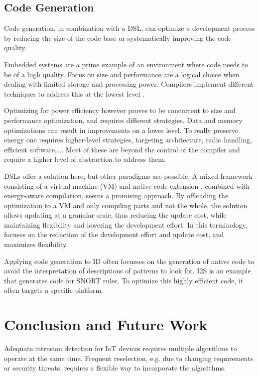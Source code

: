 \documentclass[conference]{IEEEtran}
\begin{document}
\subsection{Code Generation}

Code generation, in combination with a DSL, can optimize a development process
by reducing the size of the code base or systematically improving the code
quality.

Embedded systems are a prime example of an environment where code needs to be
of a high quality. Focus on size and performance are a logical choice when
dealing with limited storage and processing power. Compilers implement
different techniques to address this at the lowest level
\cite{marwedel2002code}.

Optimizing for power efficiency however proves to be concurrent to size and
performance optimization, and requires different strategies. Data and memory
optimizations \cite{panda2001data} can result in improvements on a lower level.
To really preserve energy one requires higher-level strategies, targeting
architecture, radio handling, efficient software,\dots \cite{naik2001software}.
Most of these are beyond the control of the compiler and require a higher level
of abstraction to address them.

DSLs offer a solution here, but other paradigms are possible. A mixed framework
consisting of a virtual machine (VM) and native code extension
\cite{sadilek2007energy}, combined with energy-aware compilation, seems a
promising approach. By offloading the optimization to a VM and only compiling
parts and not the whole, the solution allows updating at a granular scale, thus
reducing the update cost, while maintaining flexibility and lowering the
development effort. In this terminology, \NAME focuses on the reduction of the
development effort and update cost, and maximizes flexibility.

Applying code generation to ID often focusses on the generation of native code
to avoid the interpretation of descriptions of patterns to look for. I2S
\cite{charitakis2003code} is an example that generates code for SNORT
\cite{roesch1999snort} rules. To optimize this highly efficient code, it often
targets a specific platform.

\section{Conclusion and Future Work}
\label{conclusion}

Adequate intrusion detection for IoT devices requires multiple algorithms to
operate at the same time. Frequent reselection, e.g. due to changing
requirements or security threats, requires a flexible way to incorporate the
algorithms.
\end{document}
